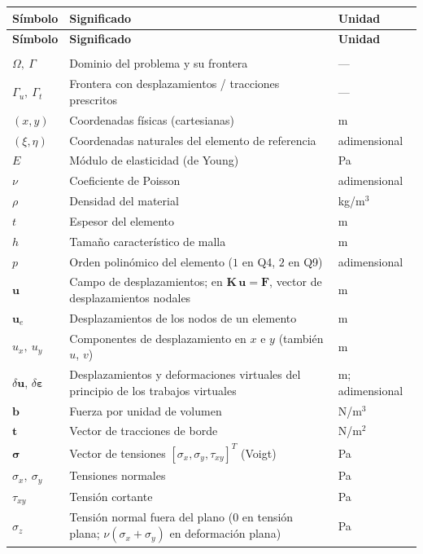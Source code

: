 \renewcommand{\arraystretch}{1.2}
\begin{longtable}{@{}>{\raggedright\arraybackslash}p{3.0cm}p{7.8cm}p{3.0cm}@{}}
\toprule
\textbf{Símbolo} & \textbf{Significado} & \textbf{Unidad} \\
\midrule
\endfirsthead
\toprule
\textbf{Símbolo} & \textbf{Significado} & \textbf{Unidad} \\
\midrule
\endhead
\bottomrule
\endfoot
\multicolumn{3}{@{}l}{\textit{Dominio, material y campos}} \\
\addlinespace
$\Omega,\ \Gamma$ & Dominio del problema y su frontera & --- \\
$\Gamma_u,\ \Gamma_t$ & Frontera con desplazamientos / tracciones prescritos & --- \\
$(x,y)$ & Coordenadas físicas (cartesianas) & m \\
$(\xi,\eta)$ & Coordenadas naturales del elemento de referencia & adimensional \\
$E$ & Módulo de elasticidad (de Young) & Pa \\
$\nu$ & Coeficiente de Poisson & adimensional \\
$\rho$ & Densidad del material & kg/m$^3$ \\
$t$ & Espesor del elemento & m \\
$h$ & Tamaño característico de malla & m \\
$p$ & Orden polinómico del elemento ($1$ en Q4, $2$ en Q9) & adimensional \\
$\bm{u}$ & Campo de desplazamientos; en $\bm{K}\,\bm{u}=\bm{F}$, vector de desplazamientos nodales & m \\
$\bm{u}_e$ & Desplazamientos de los nodos de un elemento & m \\
$u_x,\ u_y$ & Componentes de desplazamiento en $x$ e $y$ (también $u$, $v$) & m \\
$\delta\bm{u}$, $\delta\bm{\varepsilon}$ & Desplazamientos y deformaciones virtuales del principio de los trabajos virtuales & m; adimensional \\
$\bm{b}$ & Fuerza por unidad de volumen & N/m$^3$ \\
$\bm{t}$ & Vector de tracciones de borde & N/m$^2$ \\
$\bm{\sigma}$ & Vector de tensiones $[\sigma_x,\sigma_y,\tau_{xy}]^T$ (Voigt) & Pa \\
$\sigma_x,\ \sigma_y$ & Tensiones normales & Pa \\
$\tau_{xy}$ & Tensión cortante & Pa \\
$\sigma_z$ & Tensión normal fuera del plano ($0$ en tensión plana; $\nu(\sigma_x+\sigma_y)$ en deformación plana) & Pa \\

\end{longtable}
